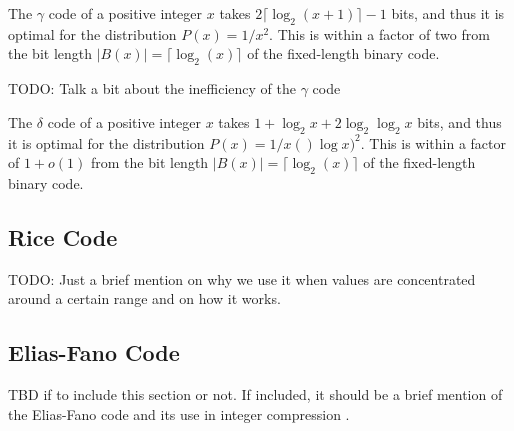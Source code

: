 \begin{theorem}
    The $\gamma$ code of a positive integer $x$ takes $2\lceil\log_2(x+1)\rceil-1$ bits, and thus it is optimal for the distribution $P(x)=1/x^2$. This is within a factor of two from the bit length $|B(x)| = \lceil\log_2(x)\rceil$ of the fixed-length binary code. \cite{ferragina2023pearls}
\end{theorem}
TODO: Talk a bit about the inefficiency of the $\gamma$ code \cite{ferragina2023pearls}

\begin{theorem}
    The $\delta$ code of a positive integer $x$ takes $1 + \log_2x + 2\log_2 \log_2 x$ bits, and thus it is optimal for the distribution $P(x)=1/x()\log x)^2$. This is within a factor of $1 + o(1)$ from the bit length $|B(x)| = \lceil\log_2(x)\rceil$ of the fixed-length binary code. \cite{ferragina2023pearls}
\end{theorem}



\subsection{Rice Code}
TODO: Just a brief mention on why we use it when values are concentrated around a certain range \cite{ferragina2023pearls,sayood2002lossless} and on how it works.

\subsection{Elias-Fano Code}
TBD if to include this section or not. If included, it should be a brief mention of the Elias-Fano code and its use in integer compression \cite{ferragina2023pearls}.
